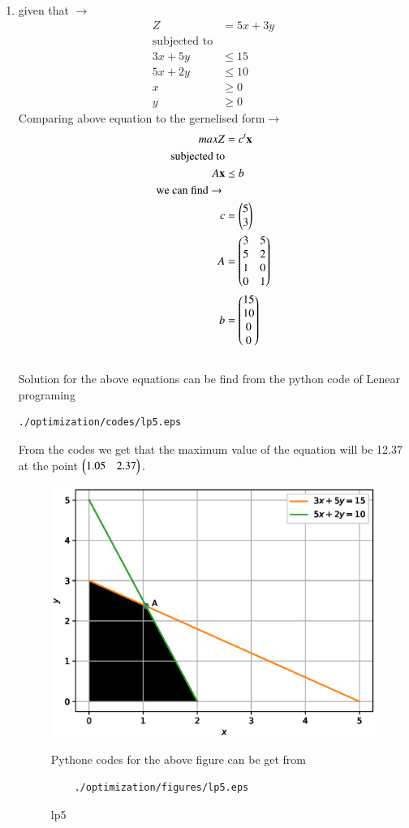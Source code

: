 \renewcommand{\theequation}{\theenumi}
\begin{enumerate}[label=\arabic*.,ref=\thesubsection.\theenumi]
\item  given that $\to$
\begin{align}
Z &= 5x + 3y
\\
\text{subjected to}
\\
3x + 5y &\leq 15
\\
5x + 2y &\leq 10
\\
x  &\geq 0
\\
y &\geq 0
\end{align}
Comparing above equation to the gernelised form$\to$ 
\begin{align}
maxZ &= c^t \mathbf{x}
\\
\text{subjected to}
\\
A\mathbf{x} &\preceq b
\\ 
\text{we can find $\to$ }
\\
c &= \begin{pmatrix}5\\ 3\end{pmatrix}
\\
A &= \begin{pmatrix}3 & 5 \\ 5 & 2\\1 &0 \\ 0 & 1\end{pmatrix}
\\
b &= \begin{pmatrix}15\\10\\ 0\\ 0\end{pmatrix}
\end{align}\\
Solution for the above equations can be find from the python code of Lenear programing 
\begin{lstlisting}
./optimization/codes/lp5.eps
\end{lstlisting}	
From the codes we get that the maximum value of the equation will be 12.37 at the point $\begin{pmatrix}1.05 & 2.37\end{pmatrix}$.

\begin{figure}[!ht]
	\centering
	\includegraphics[width=\columnwidth]{./figures/lp5.eps}
	\caption{ lp5}
	\label{fig:lp5}
	Pythone codes for the above figure can be get from
	\begin{lstlisting}
	./optimization/figures/lp5.eps
	\end{lstlisting}	
\end{figure}
\end{enumerate}